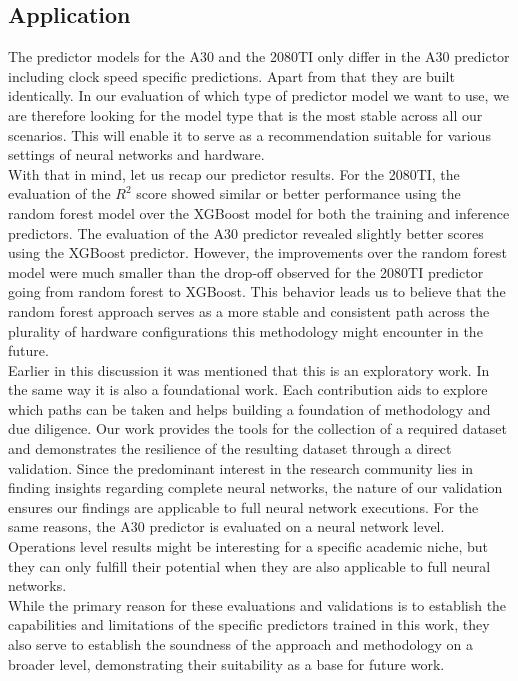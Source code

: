 \subsection{Application}
The predictor models for the A30 and the 2080TI only differ in the A30 predictor including clock speed specific predictions. Apart from that they are built identically. In our evaluation of which type of predictor model we want to use, we are therefore looking for the model type that is the most stable across all our scenarios. This will enable it to serve as a recommendation suitable for various settings of neural networks and hardware. \\
With that in mind, let us recap our predictor results. For the 2080TI, the evaluation of the $R^2$ score showed similar or better performance using the random forest model over the XGBoost model for both the training and inference predictors. The evaluation of the A30 predictor revealed slightly better scores using the XGBoost predictor. However, the improvements over the random forest model were much smaller than the drop-off observed for the 2080TI predictor going from random forest to XGBoost. This behavior leads us to believe that the random forest approach serves as a more stable and consistent path across the plurality of hardware configurations this methodology might encounter in the future. \\
Earlier in this discussion it was mentioned that this is an exploratory work. In the same way it is also a foundational work. Each contribution aids to explore which paths can be taken and helps building a foundation of methodology and due diligence. Our work provides the tools for the collection of a required dataset and demonstrates the resilience of the resulting dataset through a direct validation. Since the predominant interest in the research community lies in finding insights regarding complete neural networks, the nature of our validation ensures our findings are applicable to full neural network executions. For the same reasons, the A30 predictor is evaluated on a neural network level. Operations level results might be interesting for a specific academic niche, but they can only fulfill their potential when they are also applicable to full neural networks. \\
While the primary reason for these evaluations and validations is to establish the capabilities and limitations of the specific predictors trained in this work, they also serve to establish the soundness of the approach and methodology on a broader level, demonstrating their suitability as a base for future work.


